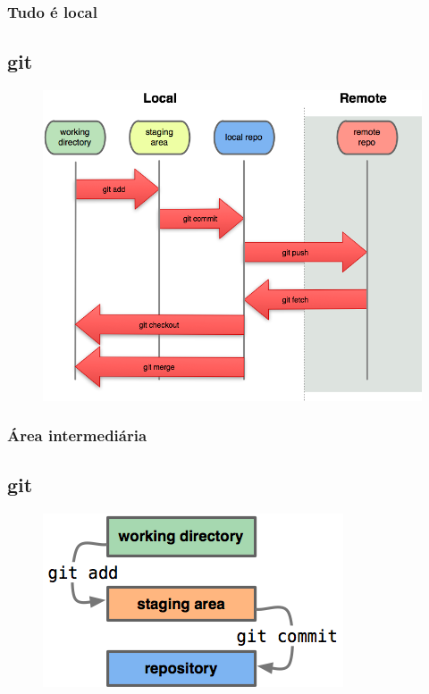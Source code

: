 \documentclass{beamer}
\begin{document}
  \begin{frame}
    \frametitle{Tudo é local}
    \subsection{git}
    \begin{figure}[htb]
     \begin{center}
    	\includegraphics[scale=0.5]{local-remote.png}
     \end{center}
    \end{figure}
    \vfill
  \end{frame}

  \begin{frame}
    \frametitle{Área intermediária}
    \subsection{git}
    \begin{figure}[htb]
     \begin{center}
    	\includegraphics[scale=1]{index1.png}
     \end{center}
    \end{figure}
    \vfill
  \end{frame}
\end{document}
